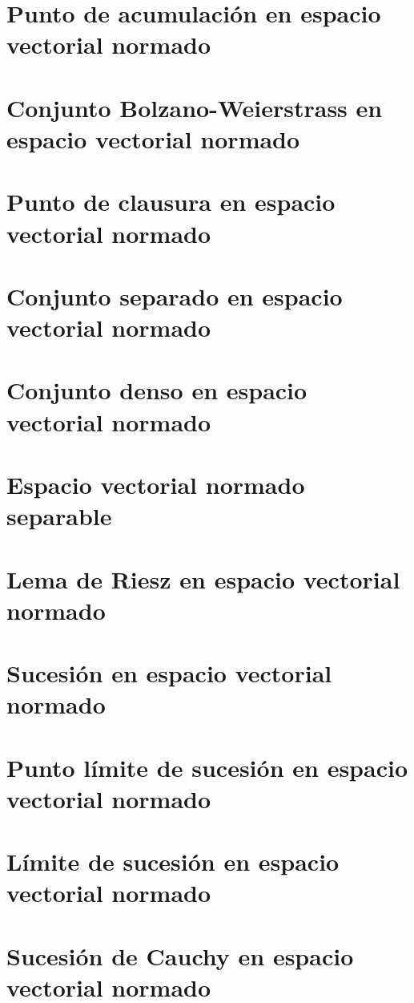 \section{Punto de acumulación en espacio vectorial normado}

\section{Conjunto Bolzano-Weierstrass en espacio vectorial normado}

\section{Punto de clausura en espacio vectorial normado}

\section{Conjunto separado en espacio vectorial normado}

\section{Conjunto denso en espacio vectorial normado}

\section{Espacio vectorial normado separable}

\section{Lema de Riesz en espacio vectorial normado}

\section{Sucesión en espacio vectorial normado}

\section{Punto límite de sucesión en espacio vectorial normado}

\section{Límite de sucesión en espacio vectorial normado}

\section{Sucesión de Cauchy en espacio vectorial normado}

